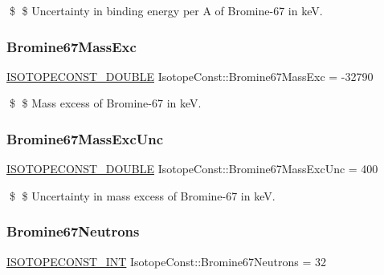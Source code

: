 \$ \$ Uncertainty in binding energy per A of Bromine-\/67 in keV. \mbox{\label{group___isotope_const-_bromine-_br67_ga012a6e3ffb67be861165baaf56ac53e9}} 
\subsubsection{\texorpdfstring{Bromine67\+Mass\+Exc}{Bromine67MassExc}}
{\footnotesize\ttfamily \mbox{\hyperlink{group___isotope_const-_macros_ga8f45a7272ce02c0b4c65c44636ed719a}{I\+S\+O\+T\+O\+P\+E\+C\+O\+N\+S\+T\+\_\+\+D\+O\+U\+B\+LE}} Isotope\+Const\+::\+Bromine67\+Mass\+Exc = -\/32790}

\$ \$ Mass excess of Bromine-\/67 in keV. \mbox{\label{group___isotope_const-_bromine-_br67_ga49f6bc01baef82af39c178c78abc8ae3}} 
\subsubsection{\texorpdfstring{Bromine67\+Mass\+Exc\+Unc}{Bromine67MassExcUnc}}
{\footnotesize\ttfamily \mbox{\hyperlink{group___isotope_const-_macros_ga8f45a7272ce02c0b4c65c44636ed719a}{I\+S\+O\+T\+O\+P\+E\+C\+O\+N\+S\+T\+\_\+\+D\+O\+U\+B\+LE}} Isotope\+Const\+::\+Bromine67\+Mass\+Exc\+Unc = 400}

\$ \$ Uncertainty in mass excess of Bromine-\/67 in keV. \mbox{\label{group___isotope_const-_bromine-_br67_ga497b0b75ba98beef03b190e081928bd3}} 
\subsubsection{\texorpdfstring{Bromine67\+Neutrons}{Bromine67Neutrons}}
{\footnotesize\ttfamily \mbox{\hyperlink{group___isotope_const-_macros_ga5f18360b3e99483a35c32d789e62621c}{I\+S\+O\+T\+O\+P\+E\+C\+O\+N\+S\+T\+\_\+\+I\+NT}} Isotope\+Const\+::\+Bromine67\+Neutrons = 32}

